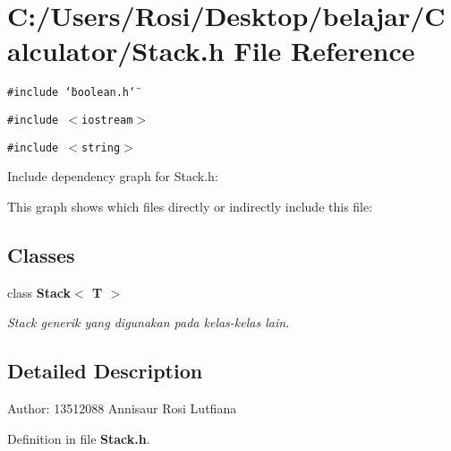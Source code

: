 \section{C:/Users/Rosi/Desktop/belajar/Calculator/Stack.h File Reference}
\label{_stack_8h}
{\tt \#include \char`\"{}boolean.h\char`\"{}}\par
{\tt \#include $<$iostream$>$}\par
{\tt \#include $<$string$>$}\par


Include dependency graph for Stack.h:

This graph shows which files directly or indirectly include this file:\subsection*{Classes}
\begin{CompactItemize}
\item 
class {\bf Stack$<$ T $>$}
\begin{CompactList}\small\item\em Stack generik yang digunakan pada kelas-kelas lain. \item\end{CompactList}\end{CompactItemize}


\subsection{Detailed Description}
\begin{Desc}
\item[Author:]13512088 Annisaur Rosi Lutfiana \end{Desc}


Definition in file {\bf Stack.h}.